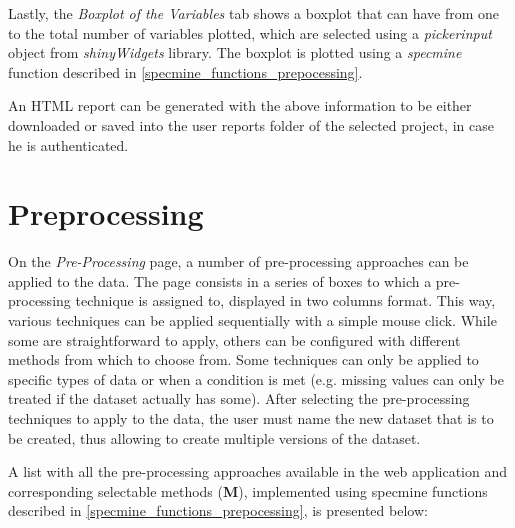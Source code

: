 Lastly, the \textit{Boxplot of the Variables} tab shows a boxplot that can have from one to the total number of variables plotted, which are selected using a \textit{pickerinput} object from \textit{shinyWidgets} library. The boxplot is plotted using a \textit{specmine} function described in \autoref{specmine_functions_prepocessing}.

An HTML report can be generated with the above information to be either downloaded or saved into the user reports folder of the selected project, in case he is authenticated.



\section{Preprocessing}

On the \textit{Pre-Processing} page, a number of pre-processing approaches can be applied to the data. The page consists in a series of boxes to which a pre-processing technique is assigned to, displayed in two columns format. This way, various techniques can be applied sequentially with a simple mouse click. While some are straightforward to apply, others can be configured with different methods from which to choose from. Some techniques can only be applied to specific types of data or when a condition is met (e.g. missing values can only be treated if the dataset actually has some). After selecting the pre-processing techniques to apply to the data, the user must name the new dataset that is to be created, thus allowing to create multiple versions of the dataset.

A list with all the pre-processing approaches available in the web application and corresponding selectable methods (\textbf{M}), implemented using specmine functions described in \autoref{specmine_functions_prepocessing}, is presented below:


